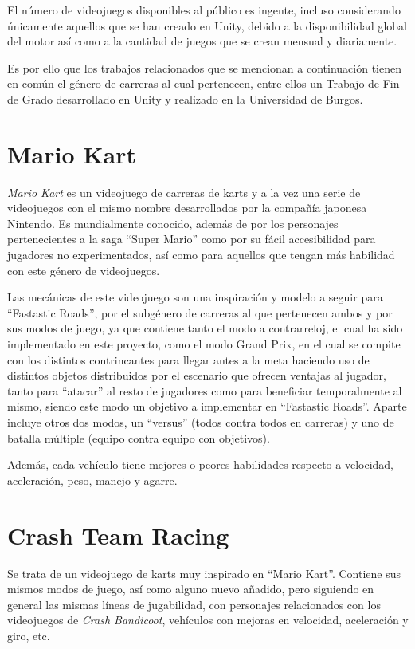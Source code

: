 
El número de videojuegos disponibles al público es ingente, incluso considerando únicamente aquellos que se han creado en Unity, debido a la disponibilidad global del motor así como a la cantidad de juegos que se crean mensual y diariamente.

Es por ello que los trabajos relacionados que se mencionan a continuación tienen en común el género de carreras al cual pertenecen, entre ellos un Trabajo de Fin de Grado desarrollado en Unity y realizado en la Universidad de Burgos.

\section{Mario Kart}

\textit{Mario Kart} es un videojuego de carreras de karts y a la vez una serie de videojuegos con el mismo nombre desarrollados por la compañía japonesa Nintendo. Es mundialmente conocido, además de por los personajes pertenecientes a la saga ``Super Mario'' como por su fácil accesibilidad para jugadores no experimentados, así como para aquellos que tengan más habilidad con este género de videojuegos.

Las mecánicas de este videojuego son una inspiración y modelo a seguir para ``Fastastic Roads'', por el subgénero de carreras al que pertenecen ambos y por sus modos de juego, ya que contiene tanto el modo a contrarreloj, el cual ha sido implementado en este proyecto, como el modo Grand Prix, en el cual se compite con los distintos contrincantes para llegar antes a la meta haciendo uso de distintos objetos distribuidos por el escenario que ofrecen ventajas al jugador, tanto para ``atacar'' al resto de jugadores como para beneficiar temporalmente al mismo, siendo este modo un objetivo a implementar en ``Fastastic Roads''. Aparte incluye otros dos modos, un ``versus'' (todos contra todos en carreras) y uno de batalla múltiple (equipo contra equipo con objetivos).

Además, cada vehículo tiene mejores o peores habilidades respecto a velocidad, aceleración, peso, manejo y agarre.

\section{Crash Team Racing}

Se trata de un videojuego de karts muy inspirado en ``Mario Kart''. Contiene sus mismos modos de juego, así como alguno nuevo añadido, pero siguiendo en general las mismas líneas de jugabilidad, con personajes relacionados con los videojuegos de \textit{Crash Bandicoot}, vehículos con mejoras en velocidad, aceleración y giro, etc.

